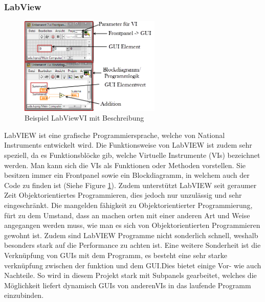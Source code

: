 \documentclass[10pt]{scrartcl}
\begin{document}
\subsubsection{LabView}
\begin{figure}
	\begin{center}
		\includegraphics[width=0.6\textwidth]{LabVIEWExample}
		\caption{Beispiel LabView\gls{VI} mit Beschreibung}
		\label{fig:LabViewExample}
	\end{center}
\end{figure}
\gls{LabVIEW} ist eine grafische Programmiersprache, welche von National Instruments entwickelt wird. Die Funktionsweise von \gls{LabVIEW} ist zudem sehr speziell, da es Funktionsblöcke gib, welche Virtuelle Instrumente (\gls{VI}s) bezeichnet werden. Man kann sich die \gls{VI}s als Funktionen oder Methoden vorstellen. Sie besitzen immer ein \gls{Frontpanel} sowie ein \gls{Blockdiagramm}, in welchem auch der Code zu finden ist (Siehe Figure \ref{fig:LabViewExample}). Zudem unterstützt \gls{LabVIEW} seit geraumer Zeit Objektorientiertes Programmieren, dies jedoch nur unzulässig und sehr eingeschränkt.
\newline
Die mangelden fähigkeit zu Objektorientierter Programmierung, fürt zu dem Umstand, dass an machen orten mit einer anderen Art und Weise angegangen werden muss, wie man es sich von Objektorientierten Programmieren gewohnt ist. Zudem sind \gls{LabVIEW} Programme nicht sonderlich schnell, weshalb besonders stark auf die Performance zu achten ist.
\newline
Eine weitere Sonderheit ist die Verknüpfung von GUIs mit dem Programm, es besteht eine sehr starke verknüpfung zwischen der funktion und dem GUI.Dies bietet einige Vor- wie auch Nachteile. So wird in diesem Projekt stark mit \gls{Subpanel}s gearbeitet, welches die Möglichkeit liefert dynamisch GUIs von anderen\gls{VI}s in das laufende Programm einzubinden.   
\end{document}
